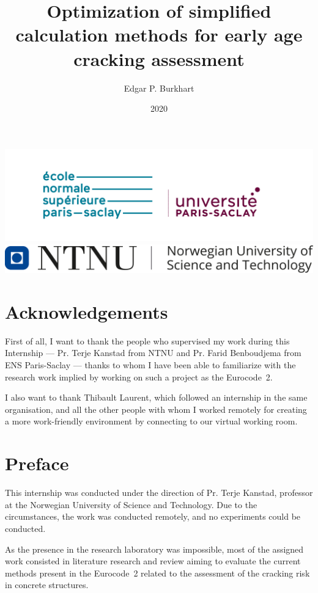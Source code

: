 \documentclass[a4paper,11pt]{memoir}
\title{Optimization of simplified calculation methods for early age cracking assessment}
\author{Edgar P. Burkhart}
\date{2020}
\begin{document}
\begin{titlingpage}
  \maketitle
  \begin{center}
    \includegraphics[width=.8\linewidth]{logoENS}
    \includegraphics[width=.6\linewidth]{logoNTNU}
  \end{center}
\end{titlingpage}

\frontmatter
\tableofcontents
\listoffigures
\listoftables

\chapter{Acknowledgements}
First of all, I want to thank the people who supervised my work during this
Internship --- Pr. Terje Kanstad from NTNU and Pr. Farid Benboudjema from ENS
Paris-Saclay --- thanks to whom I have been able to familiarize with the
research work implied by working on such a project as the Eurocode~2.

I also want to thank Thibault Laurent, which followed an internship in the same
organisation, and all the other people with whom I worked remotely for creating a more
work-friendly environment by connecting to our virtual working room.

\chapter{Preface}
This internship was conducted under the direction of Pr. Terje Kanstad,
professor at the Norwegian University of Science and Technology. Due to the
circumstances, the work was conducted remotely, and no experiments could be
conducted.

As the presence in the research laboratory was impossible, most of the assigned
work consisted in literature research and review aiming to evaluate the current
methods present in the Eurocode~2 related to the assessment of the cracking
risk in concrete structures.
\end{document}
